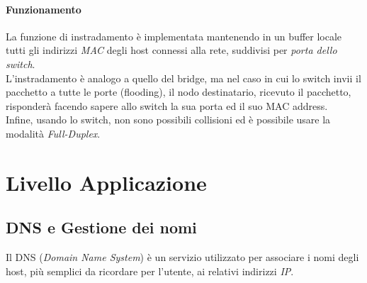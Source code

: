 \documentclass[a4paper,11pt]{article}
\begin{document}
\paragraph{Funzionamento} La funzione di instradamento è implementata mantenendo in un buffer locale tutti gli indirizzi \textit{MAC} degli host connessi alla rete, suddivisi per \textit{porta dello switch}.\\
L'instradamento è analogo a quello del bridge, ma nel caso in cui lo switch invii il pacchetto a tutte le porte (flooding), il nodo destinatario, ricevuto il pacchetto, risponderà facendo sapere allo switch la sua porta ed il suo MAC address.\\
Infine, usando lo switch, non sono possibili collisioni ed è possibile usare la modalità \textit{Full-Duplex}.

\newpage

\section{Livello Applicazione}
\subsection{DNS e Gestione dei nomi}
Il DNS (\textit{Domain Name System}) è un servizio utilizzato per associare i nomi degli host, più semplici da ricordare per l'utente, ai relativi indirizzi  \textit{IP}.
\end{document}
